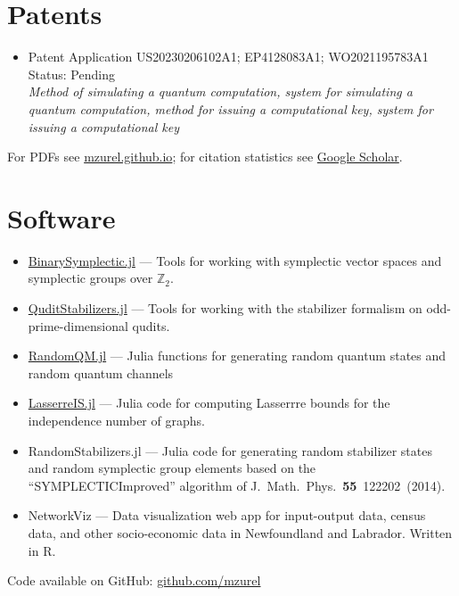 \documentclass[letterpaper,11pt]{article}
\newcommand{\ConferenceItemII}[3]{
	\item{\parbox{0.97\textwidth}{
		{#1}  \hfill {#2}\\
		\emph{#3}
	}}
}
\begin{document}
\section*{Patents}
\begin{itemize}[leftmargin=*]
	\ConferenceItemII{Patent Application US20230206102A1; EP4128083A1; WO2021195783A1}{Status: Pending}{Method of simulating a quantum computation, system for simulating a quantum computation, method for issuing a computational key, system for issuing a computational key}
\end{itemize}

\nocite{ZurelRaussendorf2024,ZurelHeimendahl2024b,ZurelHeimendahl2024a,ZurelCohenRaussendorf2023,RaussendorfFeldmann2023,OkayRaussendorf2021,ZurelRaussendorf2020,RaussendorfZurel2020}
\printbibliography[title={Publications \& preprints}]
For PDFs see \href{https://mzurel.github.io}{mzurel.github.io}; for citation statistics see \href{https://scholar.google.com/citations?user=qUA_szUAAAAJ&hl=en&oi=ao}{Google Scholar}.

\section*{Software}
\begin{itemize}[leftmargin=*]
	\item \href{https://github.com/mzurel/BinarySymplectic.jl}{BinarySymplectic.jl} --- Tools for working with symplectic vector spaces and symplectic groups over $\mathbb{Z}_2$.
	\vspace{-4pt}
	\item \href{https://github.com/mzurel/QuditStabilizers.jl}{QuditStabilizers.jl} --- Tools for working with the stabilizer formalism on odd-prime-dimensional qudits.
	\vspace{-4pt}
	\item \href{https://github.com/mzurel/RandomQM.jl}{RandomQM.jl} --- Julia functions for generating random quantum states and random quantum channels
	\vspace{-4pt}
	\item \href{https://github.com/mzurel/LasserreIS.jl}{LasserreIS.jl} --- Julia code for computing Lasserrre bounds for the independence number of graphs.
	\vspace{-4pt}
	\item %
	RandomStabilizers.jl --- Julia code for generating random stabilizer states and random symplectic group elements based on the ``SYMPLECTICImproved'' algorithm of J.~Math.~Phys.~\textbf{55}~122202~(2014).
	\vspace{-4pt}
	\item NetworkViz --- Data visualization web app for input-output data, census data, and other socio-economic data in Newfoundland and Labrador.  Written in R.
	\vspace{-4pt}
\end{itemize}
Code available on GitHub: \href{https://github.com/mzurel}{github.com/mzurel}
\end{document}
